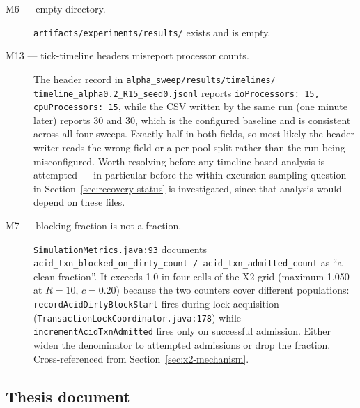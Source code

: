 \begin{description}
\item[M6 --- empty directory.]
\texttt{artifacts/experiments/results/} exists and is empty.

\item[M13 --- tick-timeline headers misreport processor counts.] The
header record in \texttt{alpha\_sweep/results/timelines/
timeline\_alpha0.2\_R15\_seed0.jsonl} reports
\texttt{ioProcessors: 15, cpuProcessors: 15}, while the CSV written by
the same run (one minute later) reports 30 and 30, which is the
configured baseline and is consistent across all four sweeps. Exactly
half in both fields, so most likely the header writer reads the wrong
field or a per-pool split rather than the run being misconfigured. Worth
resolving before any timeline-based analysis is attempted --- in
particular before the within-excursion sampling question in
Section~\ref{sec:recovery-status} is investigated, since that analysis
would depend on these files.

\item[M7 --- blocking fraction is not a fraction.]
\texttt{SimulationMetrics.java:93} documents
\texttt{acid\_txn\_blocked\_on\_dirty\_count / acid\_txn\_admitted\_count}
as ``a clean fraction''. It exceeds 1.0 in four cells of the X2 grid
(maximum 1.050 at $R = 10$, $c = 0.20$) because the two counters cover
different populations: \texttt{recordAcidDirtyBlockStart} fires during
lock acquisition
(\texttt{TransactionLockCoordinator.java:178}) while
\texttt{incrementAcidTxnAdmitted} fires only on successful admission.
Either widen the denominator to attempted admissions or drop the
fraction. Cross-referenced from Section~\ref{sec:x2-mechanism}.

\end{description}

\subsection{Thesis document}

